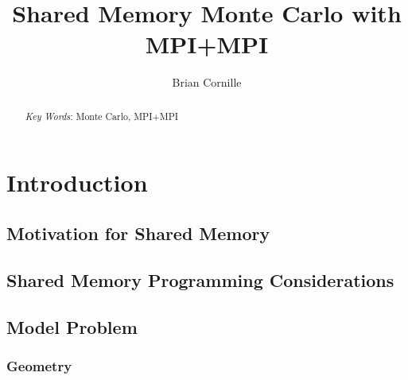 \documentclass{mc2015}
\begin{document}
\title{Shared Memory Monte Carlo with MPI+MPI}

\author{Brian Cornille}


\maketitle

\begin{abstract}



\emph{Key Words}: Monte Carlo, MPI+MPI
\end{abstract}

\section{Introduction}



\subsection{Motivation for Shared Memory}



\subsection{Shared Memory Programming Considerations}



\subsection{Model Problem}



\subsubsection{Geometry}
\end{document}
